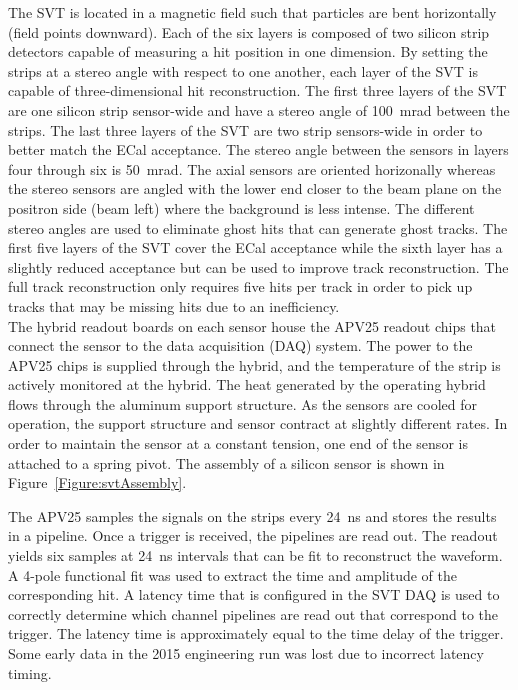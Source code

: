 The SVT is located in a magnetic field such that particles are bent horizontally (field points downward). Each of the six layers is composed of two silicon strip detectors capable of measuring a hit position in one dimension. By setting the strips at a stereo angle with respect to one another, each layer of the SVT is capable of three-dimensional hit reconstruction. The first three layers of the SVT are one silicon strip sensor-wide and have a stereo angle of 100~mrad between the strips. The last three layers of the SVT are two strip sensors-wide in order to better match the ECal acceptance. The stereo angle between the sensors in layers four through six is 50~mrad. The axial sensors are oriented horizonally whereas the stereo sensors are angled with the lower end closer to the beam plane on the positron side (beam left) where the background is less intense. The different stereo angles are used to eliminate ghost hits that can generate ghost tracks. The first five layers of the SVT cover the ECal acceptance while the sixth layer has a slightly reduced acceptance but can be used to improve track reconstruction. The full track reconstruction only requires five hits per track in order to pick up tracks that may be missing hits due to an inefficiency. \\
\indent The hybrid readout boards on each sensor house the APV25 readout chips that connect the sensor to the data acquisition (DAQ) system. The power to the APV25 chips is supplied through the hybrid, and the temperature of the strip is actively monitored at the hybrid. The heat generated by the operating hybrid  flows through the aluminum support structure. As the sensors are cooled for operation, the support structure and sensor contract at slightly different rates. In order to maintain the sensor at a constant tension, one end of the sensor is attached to a spring pivot. The assembly of a silicon sensor is shown in Figure~\ref{Figure:svtAssembly}.

The APV25 samples the signals on the strips every 24~ns and stores the results in a pipeline. Once a trigger is received, the pipelines are read out. The readout yields six samples at 24~ns intervals that can be fit to reconstruct the waveform. A 4-pole functional fit was used to extract the time and amplitude of the corresponding hit. A latency time that is configured in the SVT DAQ is used to correctly determine which channel pipelines are read out that correspond to the trigger. The latency time is approximately equal to the time delay of the trigger. Some early data in the 2015 engineering run was lost due to incorrect latency timing. 


